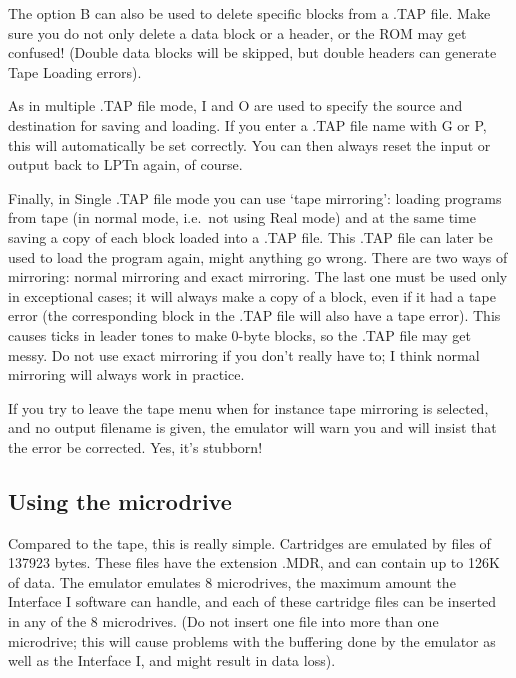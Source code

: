     The option B can also be used to delete specific blocks from a .TAP
    file.  Make sure you do not only delete a data block or a header, or the
    ROM may get confused! (Double data blocks will be skipped, but double
    headers can generate Tape Loading errors).

    As in multiple .TAP file mode, I and O are used to specify the source
    and destination for saving and loading.  If you enter a .TAP file name
    with G or P, this will automatically be set correctly.  You can then
    always reset the input or output back to LPTn again, of course.

    Finally, in Single .TAP file mode you can use `tape mirroring': loading
    programs from tape (in normal mode, i.e.\ not using Real mode) and at
    the same time saving a copy of each block loaded into a .TAP file.  This
    .TAP file can later be used to load the program again, might anything go
    wrong.  There are two ways of mirroring: normal mirroring and exact
    mirroring.  The last one must be used only in exceptional cases; it will
    always make a copy of a block, even if it had a tape error (the
    corresponding block in the .TAP file will also have a tape error).  This
    causes ticks in leader tones to make 0-byte blocks, so the .TAP file may
    get messy.  Do not use exact mirroring if you don't really have to; I
    think normal mirroring will always work in practice.

    If you try to leave the tape menu when for instance tape mirroring is
    selected, and no output filename is given, the emulator will warn you
    and will insist that the error be corrected.  Yes, it's stubborn!



\subsection{Using the microdrive}

    Compared to the tape, this is really simple.  Cartridges are emulated by
    files of 137923 bytes.  These files have the extension .MDR, and can
    contain up to 126K of data.  The emulator emulates 8 microdrives, the
    maximum amount the Interface I software can handle, and each of these
    cartridge files can be inserted in any of the 8 microdrives.  (Do not
    insert one file into more than one microdrive; this will cause problems
    with the buffering done by the emulator as well as the Interface I, and
    might result in data loss).

